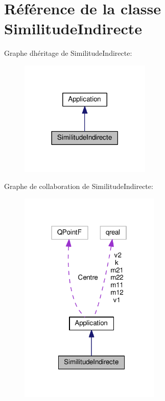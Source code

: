 \hypertarget{class_similitude_indirecte}{}\section{Référence de la classe Similitude\+Indirecte}
\label{class_similitude_indirecte}


Graphe d\textquotesingle{}héritage de Similitude\+Indirecte\+:\nopagebreak
\begin{figure}[H]
\begin{center}
\leavevmode
\includegraphics[width=177pt]{class_similitude_indirecte__inherit__graph}
\end{center}
\end{figure}


Graphe de collaboration de Similitude\+Indirecte\+:\nopagebreak
\begin{figure}[H]
\begin{center}
\leavevmode
\includegraphics[width=190pt]{class_similitude_indirecte__coll__graph}
\end{center}
\end{figure}

